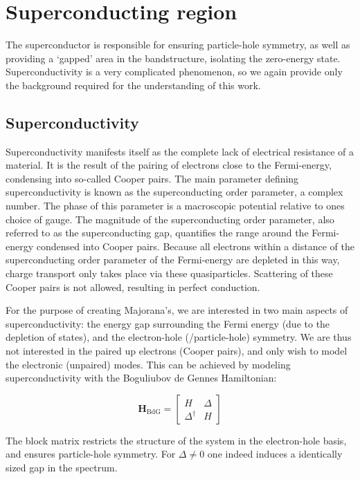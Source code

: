 \section{Superconducting region}
    The superconductor is responsible for ensuring particle-hole symmetry, as well as providing a `gapped' area in the bandstructure, isolating the zero-energy state.
    Superconductivity is a very complicated phenomenon, so we again provide only the background required for the understanding of this work.

    \subsection{Superconductivity}
		Superconductivity manifests itself as the complete lack of electrical resistance of a material.
		It is the result of the pairing of electrons close to the Fermi-energy, condensing into so-called Cooper pairs.
		The main parameter defining superconductivity is known as the superconducting order parameter, a complex number.
		The phase of this parameter is a macroscopic potential relative to ones choice of gauge.
		The magnitude of the superconducting order parameter, also referred to as the superconducting gap, quantifies the range around the Fermi-energy condensed into Cooper pairs.
		Because all electrons within a distance of the superconducting order parameter of the Fermi-energy are depleted in this way, charge transport only takes place via these quasiparticles.
		Scattering of these Cooper pairs is not allowed, resulting in perfect conduction.

		For the purpose of creating Majorana's, we are interested in two main aspects of superconductivity: the energy gap surrounding the Fermi energy (due to the depletion of states), and the electron-hole (/particle-hole) symmetry.
		We are thus not interested in the paired up electrons (Cooper pairs), and only wish to model the electronic (unpaired) modes.
		This can be achieved by modeling superconductivity with the Boguliubov de Gennes Hamiltonian:
		
		\begin{equation}
		\mathbf{H}_\text{BdG} = \begin{bmatrix} H & \Delta \\ \Delta^\dagger & H \end{bmatrix}
		\end{equation}

		The block matrix restricts the structure of the system in the electron-hole basis, and ensures particle-hole symmetry.
		For $\Delta \neq 0$ one indeed induces a identically sized gap in the spectrum.

